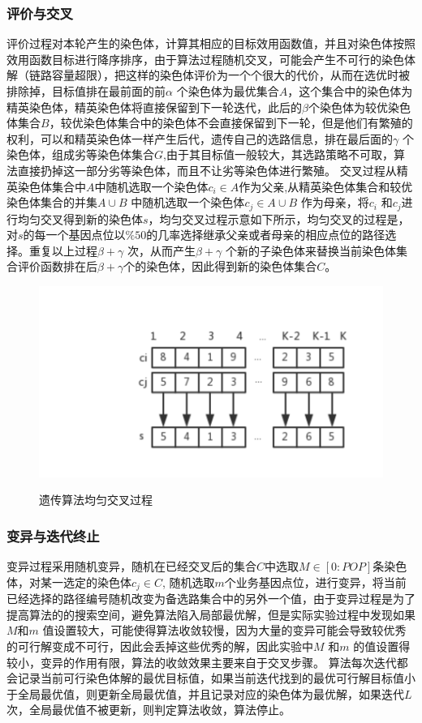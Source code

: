 \subsubsection{评价与交叉}
  评价过程对本轮产生的染色体，计算其相应的目标效用函数值，并且对染色体按照效用函数目标进行降序排序，由于算法过程随机交叉，可能会产生不可行的染色体解（链路容量超限），把这样的染色体评价为一个个很大的代价，从而在选优时被排除掉，目标值排在最前面的前$\alpha$ 个染色体为最优集合$A$，这个集合中的染色体为精英染色体，精英染色体将直接保留到下一轮迭代，此后的$\beta$个染色体为较优染色体集合$B$，较优染色体集合中的染色体不会直接保留到下一轮，但是他们有繁殖的权利，可以和精英染色体一样产生后代，遗传自己的选路信息，排在最后面的$\gamma$ 个染色体，组成劣等染色体集合$G$,由于其目标值一般较大，其选路策略不可取，算法直接扔掉这一部分劣等染色体，而且不让劣等染色体进行繁殖。
  交叉过程从精英染色体集合中$A$中随机选取一个染色体$c_i \in A$作为父亲,从精英染色体集合和较优染色体集合的并集$A \cup B$ 中随机选取一个染色体$c_j \in A \cup B$ 作为母亲，将$c_i$ 和$c_j$进行均匀交叉得到新的染色体$s$，均匀交叉过程示意如下所示，均匀交叉的过程是，对$s$的每一个基因点位以$\%50$的几率选择继承父亲或者母亲的相应点位的路径选择。重复以上过程$\beta+\gamma$ 次，从而产生$\beta+\gamma$ 个新的子染色体来替换当前染色体集合评价函数排在后$\beta+\gamma$个的染色体，因此得到新的染色体集合$C$。
\begin{figure}
\setlength{\belowcaptionskip}{-0.5cm}
  \begin{center}
    {\includegraphics[width=0.45 \textwidth]{figures/cross.pdf}}
    \end{center}
  \caption{{\footnotesize{遗传算法均匀交叉过程}}}
  \label{IterNum}
\end{figure}
\subsubsection{变异与迭代终止}
  变异过程采用随机变异，随机在已经交叉后的集合$C$中选取$M \in [0:POP]$条染色体，对某一选定的染色体$c_j \in C$, 随机选取$m$个业务基因点位，进行变异，将当前已经选择的路径编号随机改变为备选路集合中的另外一个值，由于变异过程是为了提高算法的的搜索空间，避免算法陷入局部最优解，但是实际实验过程中发现如果$M$和$m$ 值设置较大，可能使得算法收敛较慢，因为大量的变异可能会导致较优秀的可行解变成不可行，因此会丢掉这些优秀的解，因此实验中$M$ 和$m$ 的值设置得较小，变异的作用有限，算法的收敛效果主要来自于交叉步骤。
  算法每次迭代都会记录当前可行染色体解的最优目标值，如果当前迭代找到的最优可行解目标值小于全局最优值，则更新全局最优值，并且记录对应的染色体为最优解，如果迭代$L$次，全局最优值不被更新，则判定算法收敛，算法停止。
